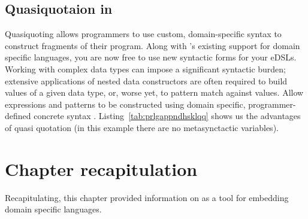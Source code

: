 \documentclass[thesis-solanki.tex]{subfiles}
\begin{document}
\subsection{Quasiquotaion in }

Quasiquoting allows programmers to use custom, domain-specific syntax to construct fragments of their program.
Along with 's existing support for domain specific languages, you are now free to use new
syntactic forms for your eDSLs.
Working with complex data types can impose a significant syntactic burden; extensive applications of nested data
constructors are often required to build values of a given data type, or, worse yet, to pattern match against
values.
Allow  expressions and patterns to be constructed using domain specific, programmer-defined
concrete syntax \cite{haskellquasi, mainland2007s}.
Listing~\ref{tab:prlgappndhsklqq} shows us the advantages of quasi quotation (in this example there are no
metasynctactic variables).


\section{Chapter recapitulation}
Recapitulating, this chapter provided information on  as a tool for embedding domain specific
languages. 


\ifMain\ifDraft
\begin{scope}
  \nolinenumbers
  \enotesize
  \par
  \begin{singlespace}
  \setlength{\parskip}{12pt plus 2pt minus 1pt}
  \theendnotes
  \par
  \end{singlespace}
\end{scope}
\fi\fi
\end{document}
